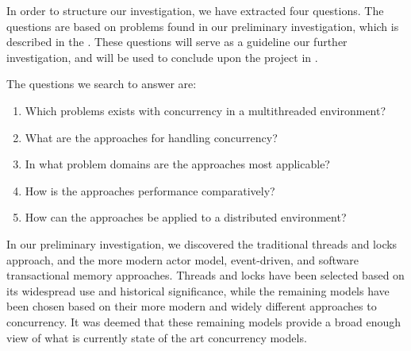 \makeatletter {}\makeatother
{}
%
In order to structure our investigation, we have extracted four questions. The questions are based on problems found in our preliminary investigation, which is described in the . These questions will serve as a guideline our further investigation, and will be used to conclude upon the project in .

The questions we search to answer are:
\begin{enumerate}
\item Which problems exists with concurrency in a multithreaded environment? 
\item What are the approaches for handling concurrency?
\item In what problem domains are the approaches most applicable?
\item How is the approaches performance comparatively?
\item How can the approaches be applied to a distributed environment?
\end{enumerate}

In our preliminary investigation, we discovered the traditional threads and locks approach, and the more modern actor model, event-driven, and software transactional memory approaches. Threads and locks have been selected based on its widespread use and historical significance, while the remaining models have been chosen based on their more modern and widely different approaches to concurrency. It was deemed that these remaining models provide a broad enough view of what is currently state of the art concurrency models. 

\worksheetend